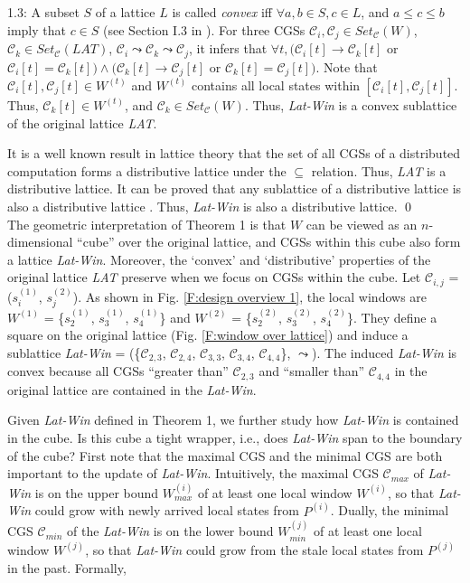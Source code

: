 \documentclass[12pt,journal,letterpaper,compsoc]{IEEEtran}
\begin{document}
1.3: A subset $S$ of a lattice $L$ is called {\it convex} iff $\forall a,b \in S, c \in L$, and $a\leq c\leq b$ imply that $c\in S$ (see Section I.3 in \cite{Gratzer03}). For three CGSs $\mathcal{C}_i, \mathcal{C}_j \in Set_{\mathcal{C}}(W)$, $\mathcal{C}_k \in Set_{\mathcal{C}}(LAT)$, $\mathcal{C}_i \leadsto \mathcal{C}_k \leadsto \mathcal{C}_j$, it infers that $\forall t, (\mathcal{C}_i[t] \rightarrow \mathcal{C}_k[t]$ or $\mathcal{C}_i[t] = \mathcal{C}_k[t]) \wedge (\mathcal{C}_k[t] \rightarrow \mathcal{C}_j[t]$ or $\mathcal{C}_k[t] = \mathcal{C}_j[t])$. Note that $\mathcal{C}_i[t], \mathcal{C}_j[t] \in W^{(t)}$ and $W^{(t)}$ contains all local states within $[\mathcal{C}_i[t], \mathcal{C}_j[t]]$. Thus, $\mathcal{C}_k[t]\in W^{(t)}$, and $\mathcal{C}_k\in Set_{\mathcal{C}}(W)$. Thus, {\it Lat-Win} is a convex sublattice of the original lattice {\it LAT}.

It is a well known result in lattice theory \cite{Davey02} that the set of all CGSs of a distributed computation forms a distributive lattice under the $\subseteq$ relation. Thus, {\it LAT} is a distributive lattice. It can be proved that any sublattice of a distributive lattice is also a distributive lattice \cite{Davey02}. Thus, {\it Lat-Win} is also a distributive lattice. \qed \\

The geometric interpretation of Theorem 1 is that $W$ can be viewed as an $n$-dimensional ``cube'' over the original lattice, and CGSs within this cube also form a lattice {\it Lat-Win}. Moreover, the `convex' and `distributive' properties of the original lattice {\it LAT} preserve when we focus on CGSs within the cube. Let $\mathcal{C}_{i,j}$ = ($s^{(1)}_{i}$, $s^{(2)}_{j}$). As shown in Fig. \ref{F:design overview 1}, the local windows are $W^{(1)}$ = \{$s^{(1)}_{2}$, $s^{(1)}_{3}$, $s^{(1)}_{4}$\} and $W^{(2)}$ = \{$s^{(2)}_{2}$, $s^{(2)}_{3}$, $s^{(2)}_{4}$\}. They define a square on the original lattice (Fig. \ref{F:window over lattice}) and induce a sublattice {\it Lat-Win} = (\{$\mathcal{C}_{2,3}$, $\mathcal{C}_{2,4}$, $\mathcal{C}_{3,3}$, $\mathcal{C}_{3,4}$, $\mathcal{C}_{4,4}$\}, $\leadsto$). The induced {\it Lat-Win} is convex because all CGSs ``greater than'' $\mathcal{C}_{2,3}$ and ``smaller than'' $\mathcal{C}_{4,4}$ in the original lattice are contained in the {\it Lat-Win}.

Given {\it Lat-Win} defined in Theorem 1, we further study how {\it Lat-Win} is contained in the cube. Is this cube a tight wrapper, i.e., does {\it Lat-Win} span to the boundary of the cube? First note that the maximal CGS and the minimal CGS are both important to the update of {\it Lat-Win}. Intuitively, the maximal CGS $\mathcal{C}_{max}$ of {\it Lat-Win} is on the upper bound $W^{(i)}_{max}$ of at least one local window $W^{(i)}$, so that {\it Lat-Win} could grow with newly arrived local states from $P^{(i)}$. Dually, the minimal CGS $\mathcal{C}_{min}$ of the {\it Lat-Win} is on the lower bound $W^{(j)}_{min}$ of at least one local window $W^{(j)}$, so that {\it Lat-Win} could grow from the stale local states from $P^{(j)}$ in the past. Formally,\\
\end{document}
